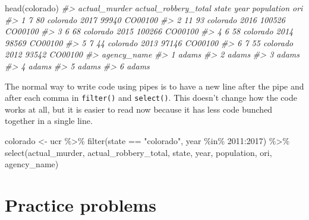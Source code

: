 \documentclass[
]{krantz}
\makeatletter
\newenvironment{Shaded}{\begin{snugshade}}{\end{snugshade}}
\newcommand{\CommentTok}[1]{\textcolor[rgb]{0.37,0.37,0.37}{\textit{#1}}}
\newcommand{\DecValTok}[1]{\textcolor[rgb]{0.06,0.06,0.06}{#1}}
\newcommand{\FunctionTok}[1]{\textcolor[rgb]{0,0,0}{#1}}
\newcommand{\NormalTok}[1]{#1}
\newcommand{\OtherTok}[1]{\textcolor[rgb]{0.37,0.37,0.37}{#1}}
\newcommand{\SpecialCharTok}[1]{\textcolor[rgb]{0,0,0}{#1}}
\newcommand{\StringTok}[1]{\textcolor[rgb]{0.5,0.5,0.5}{#1}}
\newenvironment{kframe}{%
\medskip{}
\setlength{\fboxsep}{.8em}
 \def\at@end@of@kframe{}%
 \ifinner\ifhmode%
  \def\at@end@of@kframe{\end{minipage}}%
  \begin{minipage}{\columnwidth}%
 \fi\fi%
 \def\FrameCommand##1{\hskip\@totalleftmargin \hskip-\fboxsep
 \colorbox{shadecolor}{##1}\hskip-\fboxsep
     \hskip-\linewidth \hskip-\@totalleftmargin \hskip\columnwidth}%
 \MakeFramed {\advance\hsize-\width
   \@totalleftmargin\z@ \linewidth\hsize
   \@setminipage}}%
 {\par\unskip\endMakeFramed%
 \at@end@of@kframe}
\renewenvironment{Shaded}{\begin{kframe}}{\end{kframe}}
\makeatother
\begin{document}
\begin{Shaded}
\begin{Highlighting}[]
\FunctionTok{head}\NormalTok{(colorado)}
\CommentTok{\#\textgreater{}   actual\_murder actual\_robbery\_total    state year population     ori}
\CommentTok{\#\textgreater{} 1             7                   80 colorado 2017      99940 CO00100}
\CommentTok{\#\textgreater{} 2            11                   93 colorado 2016     100526 CO00100}
\CommentTok{\#\textgreater{} 3             6                   68 colorado 2015     100266 CO00100}
\CommentTok{\#\textgreater{} 4             6                   58 colorado 2014      98569 CO00100}
\CommentTok{\#\textgreater{} 5             7                   44 colorado 2013      97146 CO00100}
\CommentTok{\#\textgreater{} 6             7                   55 colorado 2012      93542 CO00100}
\CommentTok{\#\textgreater{}   agency\_name}
\CommentTok{\#\textgreater{} 1       adams}
\CommentTok{\#\textgreater{} 2       adams}
\CommentTok{\#\textgreater{} 3       adams}
\CommentTok{\#\textgreater{} 4       adams}
\CommentTok{\#\textgreater{} 5       adams}
\CommentTok{\#\textgreater{} 6       adams}
\end{Highlighting}
\end{Shaded}

The normal way to write code using pipes is to have a new line after the pipe and after each comma in \texttt{filter()} and \texttt{select()}. This doesn't change how the code works at all, but it is easier to read now because it has less code bunched together in a single line.

\begin{Shaded}
\begin{Highlighting}[]
\NormalTok{colorado }\OtherTok{\textless{}{-}}\NormalTok{ ucr }\SpecialCharTok{\%\textgreater{}\%}
  \FunctionTok{filter}\NormalTok{(state }\SpecialCharTok{==} \StringTok{"colorado"}\NormalTok{,}
\NormalTok{         year }\SpecialCharTok{\%in\%} \DecValTok{2011}\SpecialCharTok{:}\DecValTok{2017}\NormalTok{) }\SpecialCharTok{\%\textgreater{}\%}
  \FunctionTok{select}\NormalTok{(actual\_murder, }
\NormalTok{         actual\_robbery\_total,}
\NormalTok{         state, }
\NormalTok{         year,}
\NormalTok{         population,}
\NormalTok{         ori, }
\NormalTok{         agency\_name)}
\end{Highlighting}
\end{Shaded}

\hypertarget{practice-problems-5}{%
\section{Practice problems}\label{practice-problems-5}}
\end{document}
